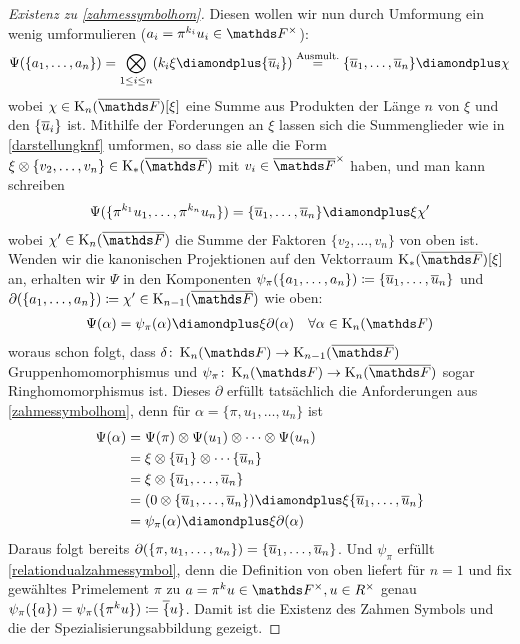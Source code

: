 \documentclass[ngerman,fontsize=11pt, paper=a4, parskip=half, titlepage=true, toc=bib]{scrartcl}
\begin{document}
\begin{proof}[Existenz zu \ref{zahmessymbolhom}]
  Diesen wollen wir nun durch Umformung ein wenig umformulieren
  ($a_i=\pi^{k_i}u_i\in\Fx$):
  \begin{gather*}
    \Psi(\{a_1,\dotsc,a_n\})
    =\bigotimes_{1\leq i\leq n}(k_i\xi\p\{\ov u_i\})
    \overset{\text{Ausmult.}}{=}
    \{\ov u_1,\dotsc,\ov u_n\}\p \chi
  \end{gather*}
  wobei $\chi\in\KnbF[\xi]$ eine Summe aus Produkten der Länge $n$ 
  von $\xi$ und den $\{\overline u_i\}$ ist.
  Mithilfe der Forderungen an $\xi$  lassen sich die Summenglieder 
  wie in \ref{darstellungknf} umformen, so dass sie alle die Form
  $\xi\otimes\{v_2,\dotsc, v_n\}\in\KbF$ mit $v_i\in\bF^\times$
  haben,
  und man kann schreiben
  \begin{gather*}
    \Psi(\{\pi^{k_1}u_1,\dotsc,\pi^{k_n}u_n\}) 
    = \{\ov u_1,\dotsc,\ov u_n\}\p \xi\chi'
  \end{gather*}
  wobei $\chi'\in\KnbF$ die Summe der Faktoren $\{v_2,\dotsc,v_n\}$
  von oben ist.
  Wenden wir die kanonischen Projektionen auf den Vektorraum 
  $\KbF[\xi]$ an, erhalten wir $\Psi$ in den Komponenten
  $\psi_\pi(\{a_1,\dotsc,a_n\})\coloneqq \{\overline u_1,\dotsc,\overline u_n\}$
  und $\partial(\{a_1,\dotsc,a_n\})\coloneqq \chi'\in\K_{n-1}(\bF)$ wie oben:
  \begin{gather*}
    \Psi(\alpha) = \psi_\pi(\alpha)\p \xi\partial(\alpha)
    \quad \forall\alpha\in\KnF
  \end{gather*}
  woraus schon folgt, 
  dass $\delta\colon\KnF\to\K_{n-1}(\bF)$ Gruppenhomomorphismus 
  und $\psi_\pi\colon\KnF\to\KnbF$ sogar Ringhomomorphismus ist.
  Dieses $\partial$ erfüllt tatsächlich die Anforderungen aus 
  \ref{zahmessymbolhom}, denn für $\alpha=\{\pi,u_1,\dotsc, u_n\}$ ist
  \begin{align*}
    \Psi(\alpha)
    &=\Psi(\pi)\otimes\Psi(u_1)\otimes\dotsb\otimes\Psi(u_n)\\
    &=\xi\otimes\{\ov u_1\}\otimes\dotsb\{\ov u_n\}\\
    &=\xi\otimes\{\ov u_1,\dotsc,\ov u_n\}\\
    &=(0\otimes\{\ov u_1,\dotsc,\ov u_n\})
      \p\xi\{\ov u_1,\dotsc,\ov u_n\}\\
    &=\psi_\pi(\alpha) \p \xi\partial(\alpha)
  \end{align*}
  Daraus folgt bereits
  $\partial(\{\pi,u_1,\dotsc,u_n\})=\{\overline u_1,\dotsc,\overline u_n\}$.  
  Und $\psi_\pi$ erfüllt \ref{relationdualzahmessymbol}, denn 
  die Definition von oben liefert für $n=1$ und fix gewähltes
  Primelement $\pi$ zu $a=\pi^ku\in\Fx, u\in\Rx$ genau
  $\psi_\pi(\{a\})=\psi_\pi(\{\pi^ku\})\coloneqq\overline \{u\}$.
  Damit ist die Existenz des Zahmen Symbols und die der
  Spezialisierungsabbildung gezeigt.
\end{proof}
\end{document}
